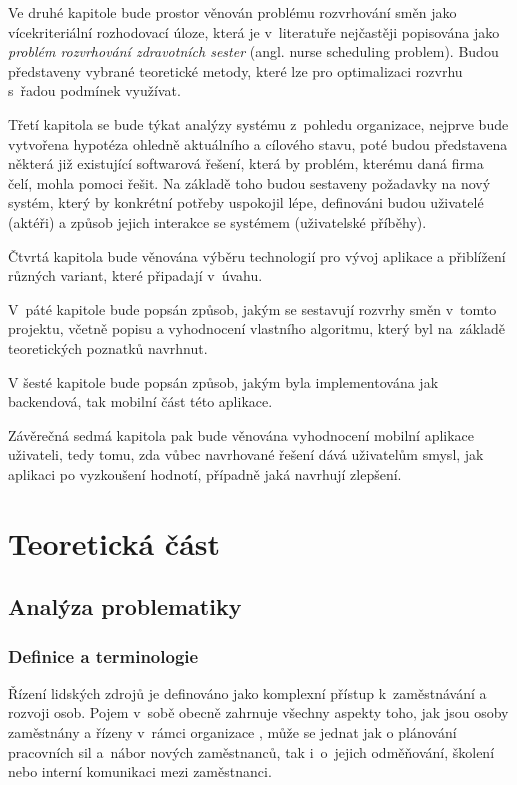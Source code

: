 \documentclass[twoside]{ctuthesis}
\begin{document}
Ve druhé kapitole bude prostor věnován problému rozvrhování směn jako vícekriteriální rozhodovací úloze, která je v~literatuře nejčastěji popisována jako \textit{problém rozvrhování zdravotních sester} (angl. nurse scheduling problem). Budou představeny vybrané teoretické metody, které lze pro optimalizaci rozvrhu s~řadou podmínek využívat.

Třetí kapitola se bude týkat analýzy systému z~pohledu organizace, nejprve bude vytvořena hypotéza ohledně aktuálního a cílového stavu, poté budou představena některá již existující softwarová řešení, která by problém, kterému daná firma čelí, mohla pomoci řešit. Na základě toho budou sestaveny požadavky na nový systém, který by konkrétní potřeby uspokojil lépe, definováni budou uživatelé (aktéři) a způsob jejich interakce se systémem (uživatelské příběhy).

Čtvrtá kapitola bude věnována výběru technologií pro vývoj aplikace a přiblížení různých variant, které připadají v~úvahu.

V~páté kapitole bude popsán způsob, jakým se sestavují rozvrhy směn v~tomto projektu, včetně popisu a vyhodnocení vlastního algoritmu, který byl na~základě teoretických poznatků navrhnut.

V šesté kapitole bude popsán způsob, jakým byla implementována jak backendová, tak mobilní část této aplikace.

Závěrečná sedmá kapitola pak bude věnována vyhodnocení mobilní aplikace uživateli, tedy tomu, zda vůbec navrhované řešení dává uživatelům smysl, jak aplikaci po vyzkoušení hodnotí, případně jaká navrhují zlepšení.

\part{Teoretická část}
\chapter{Analýza problematiky}

\section{Definice a terminologie}

Řízení lidských zdrojů je definováno jako komplexní přístup k~zaměstnávání a rozvoji osob. Pojem v~sobě obecně zahrnuje všechny aspekty toho, jak jsou osoby zaměstnány a řízeny v~rámci organizace \cite[s.~1]{armstrong2014}, může se jednat jak o plánování pracovních sil a~nábor nových zaměstnanců, tak i~o~jejich odměňování, školení nebo interní komunikaci mezi zaměstnanci. \cite[s.~37]{armstrong2014}
\end{document}
